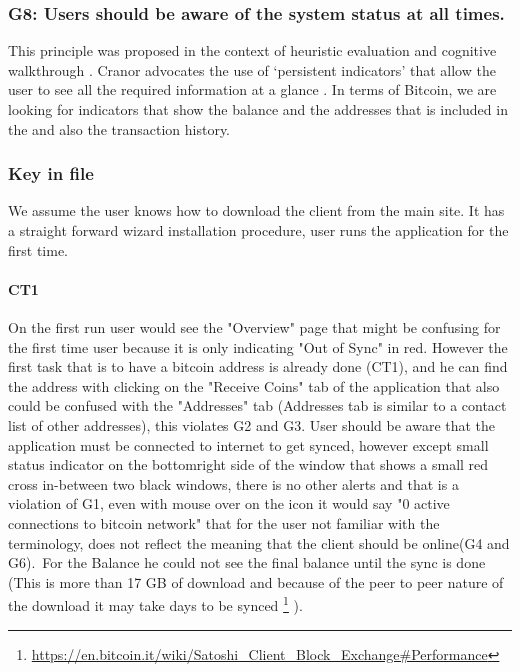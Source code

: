 \subsubsection*{G8: Users should be aware of the system status at all times.} This principle was proposed in the context of heuristic evaluation \cite{cw} and cognitive walkthrough \cite{pvo}. Cranor advocates the use of `persistent indicators' that allow the user to see all the required information at a glance \cite{p3p}. In terms of Bitcoin, we are looking for indicators that show the balance and the addresses that is included in the \walletfile and also the transaction history.

\subsubsection{Key in file}
We assume the user knows how to download the client from the main site. It has a straight forward wizard installation procedure, user runs the application for the first time. 

 \paragraph{CT1}  On the first run user would see the "Overview" page that might be confusing for the first time user because it is only indicating "Out of Sync" in red. However the first task that is to have a bitcoin address is already done (CT1), and he can find the address with clicking on the "Receive Coins" tab of the application that also could be confused with the "Addresses" tab (Addresses tab is similar to a contact list of other addresses), this violates G2 and G3.
User should be aware that the application must be connected to internet to get synced, however except small status indicator on the bottomright side of the window that shows a small red cross in-between two black windows, there is no other alerts and that is a violation of G1, even with mouse over on the icon it would say "0 active connections to bitcoin network" that for the user not familiar with the terminology, does not reflect the meaning that the client should be online(G4 and G6).\ 
For the Balance he could not see the final balance until the sync is done (This is more than 17 GB of download and because of the peer to peer nature of the download it may take days to be synced \footnote {\url { https://en.bitcoin.it/wiki/Satoshi_Client_Block_Exchange\#Performance}} ).

